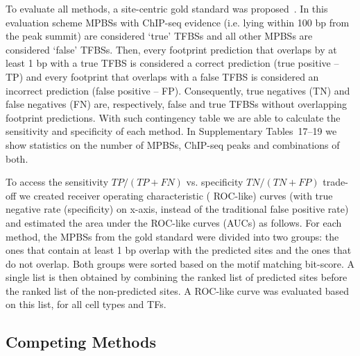 \documentclass{bioinfo}
\begin{document}
\begin{methods}
To evaluate all methods, a site-centric gold standard was proposed~\citep{cuellar2012}.
In this evaluation scheme MPBSs with ChIP-seq evidence (i.e. lying within 100 bp from
the peak summit) are considered `true' TFBSs and all other MPBSs are considered `false'
TFBSs. Then, every footprint prediction that overlaps by at least 1 bp with a true TFBS
is considered a correct prediction (true positive -- TP) {\color{red} and every footprint
that overlaps with a false TFBS is considered an incorrect prediction (false positive -- FP).}
Consequently, true negatives (TN) and false negatives (FN) are, respectively, {\color{red}
false and true TFBSs without overlapping footprint predictions.}
{\color{red} With such contingency
table we are able to calculate the sensitivity and specificity of each method}. In Supplementary {\color{red} Tables~17--19}
we show statistics on the number of MPBSs, ChIP-seq peaks and combinations of both.

To access the sensitivity $TP/(TP+FN)$ vs. specificity
$TN/(TN+FP)$ trade-off we created receiver operating characteristic
({\color{red} ROC-like}) curves (with true negative rate (specificity) on x-axis, instead of the traditional
false positive rate) and estimated the area under the {\color{red} ROC-like} curves (AUCs) as follows. For each
method, the MPBSs from the gold standard were divided into two groups: the ones that contain
at least 1 bp overlap with the predicted sites and the ones that do not overlap. Both groups
were sorted based on the motif matching bit-score. A single list is then obtained by combining
the ranked list of predicted sites before the ranked list of the non-predicted sites. A {\color{red} ROC-like}
curve was evaluated based on this list, for all cell types and TFs.

\subsection{Competing Methods}
\label{sec:competing.methods}


\end{methods}
\end{document}
